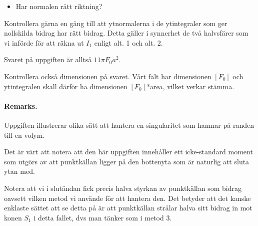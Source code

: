 \documentclass[%
oneside,                 %
final,                   %
10pt]{article}
\newenvironment{doconceexercise}{}{}
\begin{document}
\begin{doconceexercise}
\begin{itemize}
\item Har normalen rätt riktning?
\end{itemize}

\noindent
Kontrollera gärna en gång till att ytnormalerna i de ytintegraler som ger nollskilda bidrag har rätt bidrag. Detta gäller i synnerhet de två halvsfärer som vi införde för att räkna ut $I_1$ enligt alt. 1 och alt. 2.

Svaret på uppgiften är alltså $11\pi F_0 a^2$.

Kontrollera också dimensionen på svaret. Vårt fält har dimensionen $[F_0]$ och ytintegralen skall därför ha dimensionen $[F_0]$*area, vilket verkar stämma.



\paragraph{Remarks.}
Uppgiften illustrerar olika sätt att hantera en singularitet som hamnar på randen till en volym.

Det är värt att notera att den här uppgiften innehåller ett icke-standard moment som utgörs av att punktkällan ligger på den bottenyta som är naturlig att sluta ytan med. 

Notera att vi i slutändan fick precis halva styrkan 
av punktkällan som bidrag oavsett vilken metod vi använde för att hantera den. Det betyder att det kanske enklaste sättet att se detta på är att punktkällan strålar 
halva sitt bidrag in mot konen $S_1$ i detta fallet, dvs man tänker som i 
metod 3.


\end{doconceexercise}


\end{document}
